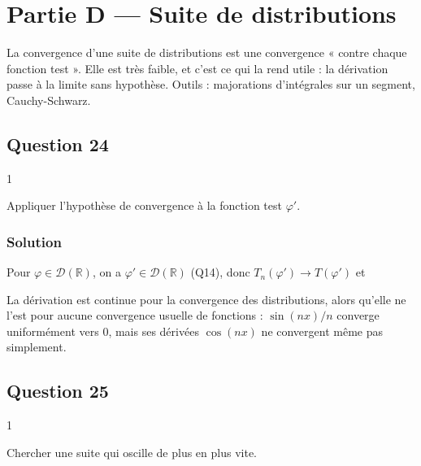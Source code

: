\documentclass[11pt,a4paper]{article}
\newcommand{\equationajustee}[1]{%
  \sbox{\boiteequation}{$\displaystyle #1$}%
  \ifdim\wd\boiteequation>\linewidth
    \[\resizebox{\linewidth}{!}{\usebox{\boiteequation}}\]%
  \else
    \[#1\]%
  \fi}
\begin{document}
\hypertarget{partie-d-suite-de-distributions}{%
\section{Partie D --- Suite de distributions}\label{partie-d-suite-de-distributions}}

La convergence d'une suite de distributions est une convergence « contre chaque fonction test ». Elle est très faible, et c'est ce qui la rend utile : la dérivation passe à la limite sans hypothèse. Outils : majorations d'intégrales sur un segment, Cauchy-Schwarz.

\hypertarget{question-24}{%
\subsection{Question 24}\label{question-24}}

\begin{indication}{1}

Appliquer l'hypothèse de convergence à la fonction test \(\varphi'\).

\end{indication}

\hypertarget{solution-23}{%
\subsubsection{Solution}\label{solution-23}}

Pour \(\varphi\in\mathcal D(\mathbb R)\), on a \(\varphi'\in\mathcal D(\mathbb R)\) (Q14), donc \(T_n(\varphi')\to T(\varphi')\) et
\equationajustee{T_n'(\varphi)=-T_n(\varphi')\longrightarrow-T(\varphi')=T'(\varphi).}
\equationajustee{\boxed{\lim_{n\to+\infty}T_n'\overset{\mathcal D}{=}T'}}

\begin{methode}

La dérivation est continue pour la convergence des distributions, alors qu'elle ne l'est pour aucune convergence usuelle de fonctions : \(\sin(nx)/n\) converge uniformément vers \(0\), mais ses dérivées \(\cos(nx)\) ne convergent même pas simplement.

\end{methode}

\hypertarget{question-25}{%
\subsection{Question 25}\label{question-25}}

\begin{indication}{1}

Chercher une suite qui oscille de plus en plus vite.

\end{indication}
\end{document}
